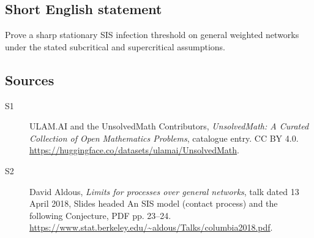 \documentclass[11pt]{article}
\begin{document}
\subsection{Short English statement}
Prove a sharp stationary SIS infection threshold on general weighted networks under the stated subcritical and supercritical assumptions.
\subsection{Sources}
\begin{description}
\item[\hypertarget{source:statement:1}{S1}] ULAM.AI and the UnsolvedMath Contributors, \emph{UnsolvedMath: A Curated Collection of Open Mathematics Problems}, catalogue entry. CC BY 4.0. \url{https://huggingface.co/datasets/ulamai/UnsolvedMath}.
\item[\hypertarget{source:statement:2}{S2}] David Aldous, \emph{Limits for processes over general networks}, talk dated 13 April 2018, Slides headed An SIS model (contact process) and the following Conjecture, PDF pp. 23--24. \url{https://www.stat.berkeley.edu/~aldous/Talks/columbia2018.pdf}.
\end{description}
\label{end:statement}
\end{document}

